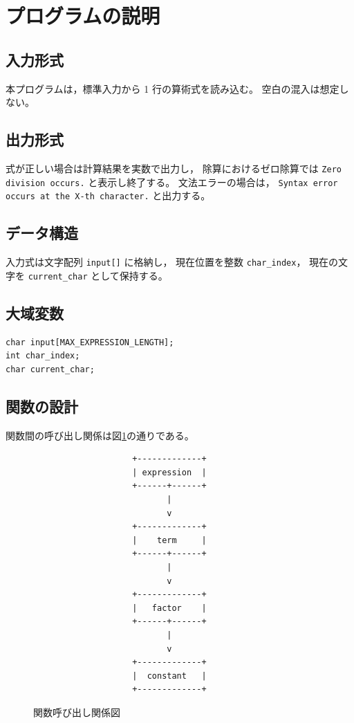 \documentclass[a4paper,12pt,titlepage]{jsarticle}
\begin{document}
\section{プログラムの説明}

\subsection{入力形式}
本プログラムは，標準入力から 1 行の算術式を読み込む。
空白の混入は想定しない。

\subsection{出力形式}
式が正しい場合は計算結果を実数で出力し，
除算におけるゼロ除算では
\verb|Zero division occurs.| と表示し終了する。
文法エラーの場合は，
\verb|Syntax error occurs at the X-th character.| と出力する。

\subsection{データ構造}
入力式は文字配列 \verb|input[]| に格納し，
現在位置を整数 \verb|char_index|，
現在の文字を \verb|current_char| として保持する。

\subsection{大域変数}
\begin{verbatim}
char input[MAX_EXPRESSION_LENGTH];
int char_index;
char current_char;
\end{verbatim}

\subsection{関数の設計}

関数間の呼び出し関係は図\ref{fig:callgraph}の通りである。

\begin{figure}[h]
\centering
\begin{verbatim}
                    +-------------+
                    | expression  |
                    +------+------+
                           |
                           v
                    +-------------+
                    |    term     |
                    +------+------+
                           |
                           v
                    +-------------+
                    |   factor    |
                    +------+------+
                           |
                           v
                    +-------------+
                    |  constant   |
                    +-------------+
\end{verbatim}
\caption{関数呼び出し関係図}
\label{fig:callgraph} 
\end{figure}
\end{document}
